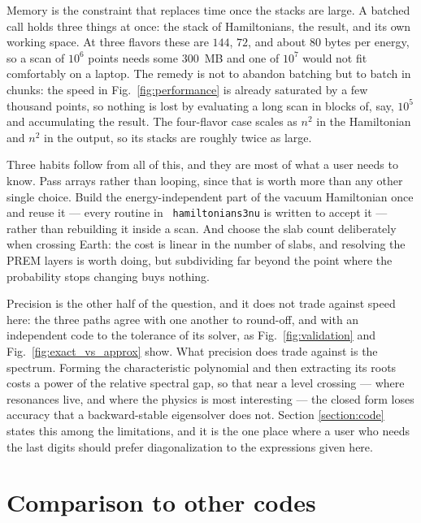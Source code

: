 \documentclass[final,5p,times,twocolumn]{elsarticle}
\newcommand{\fig}{Fig.}
\newcommand{\figu}[1]{\fig~\ref{fig:#1}}
\providecommand{\DIFaddtex}[1]{{\protect\color{blue} \sf #1}} %
\providecommand{\DIFaddbegin}{} %
\providecommand{\DIFaddend}{} %
\providecommand{\DIFadd}[1]{\DIFaddtex{#1}} %
\begin{document}
\DIFadd{Memory is the constraint that replaces time once the stacks are large.  A batched call holds three things at once: the stack of Hamiltonians, the result, and its own working space.  At three flavors these are $144$, $72$, and about $80$ bytes per energy, so a scan of $10^6$ points needs some $300$~MB and one of $10^7$ would not fit comfortably on a laptop.  The remedy is not to abandon batching but to batch in chunks: the speed in \figu{performance} is already saturated by a few thousand points, so nothing is lost by evaluating a long scan in blocks of, say, $10^5$ and accumulating the result.  The four-flavor case scales as $n^2$ in the Hamiltonian and $n^2$ in the output, so its stacks are roughly twice as large.
}

\DIFadd{Three habits follow from all of this, and they are most of what a user needs to know.  Pass arrays rather than looping, since that is worth more than any other single choice.  Build the energy-independent part of the vacuum Hamiltonian once and reuse it --- every routine in }{\tt \DIFadd{hamiltonians3nu}} \DIFadd{is written to accept it --- rather than rebuilding it inside a scan.  And choose the slab count deliberately when crossing Earth: the cost is linear in the number of slabs, and resolving the PREM layers is worth doing, but subdividing far beyond the point where the probability stops changing buys nothing.
}

\DIFadd{Precision is the other half of the question, and it does not trade against speed here: the three paths agree with one another to round-off, and with an independent code to the tolerance of its solver, as \figu{validation} and \figu{exact_vs_approx} show.  What precision does trade against is the spectrum.  Forming the characteristic polynomial and then extracting its roots costs a power of the relative spectral gap, so that near a level crossing --- where resonances live, and where the physics is most interesting --- the closed form loses accuracy that a backward-stable eigensolver does not.  Section \ref{section:code} states this among the limitations, and it is the one place where a user who needs the last digits should prefer diagonalization to the expressions given here.
}


\DIFaddend %


\DIFaddbegin \section{\DIFadd{Comparison to other codes}}
\label{section:comparison}
\end{document}
